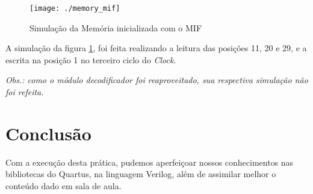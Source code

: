 \documentclass[12pt, a4paper]{article}
\begin{document}
	\begin{figure}[H]
		\centering
		\texttt{[image: ./memory\_mif]}
		\caption{Simulação da Memória inicializada com o MIF}
		\label{fig: memory and mif}
	\end{figure}

	\par A simulação da figura \ref{fig: memory and mif}, foi feita realizando a leitura das posições 11, 20 e 29, e a escrita na posição 1 no terceiro ciclo do \textit{Clock}.
	
	\vspace{\baselineskip}
	
	\par \textit{Obs.: como o módulo decodificador foi reaproveitado, sua respectiva simulação não foi refeita.}
    

	\section{Conclusão}
	
	\par Com a execução desta prática, pudemos aperfeiçoar nossos conhecimentos nas bibliotecas do Quartus, na linguagem Verilog, além de assimilar melhor o conteúdo dado em sala de aula.
\end{document}
